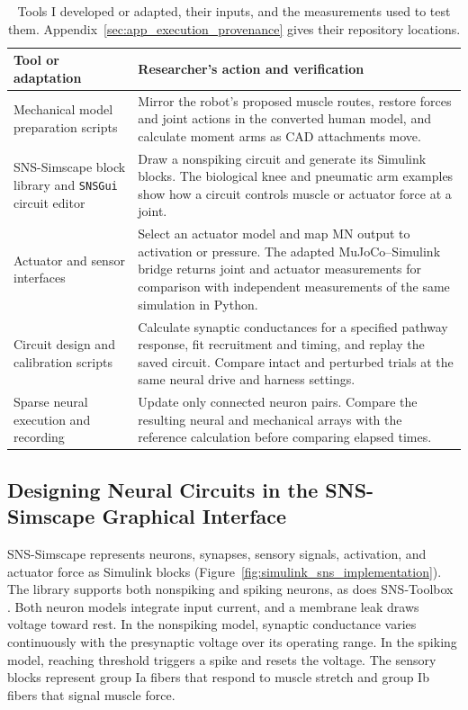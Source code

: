 \begin{table}[!htbp]
\centering\small
\caption[Tools developed or adapted for controller experiments]{Tools I developed or adapted, their inputs, and the measurements used to test them. Appendix~\ref{sec:app_execution_provenance} gives their repository locations.}
\label{tab:sns_capability}
\begin{tabularx}{\textwidth}{@{}>{\raggedright\arraybackslash}p{}>{\raggedright\arraybackslash}X@{}}
\toprule
Tool or adaptation & Researcher's action and verification \\
\midrule
Mechanical model preparation scripts & Mirror the robot's proposed muscle routes, restore forces and joint actions in the converted human model, and calculate moment arms as CAD attachments move. \\
SNS-Simscape block library and \texttt{SNSGui} circuit editor & Draw a nonspiking circuit and generate its Simulink blocks. The biological knee and pneumatic arm examples show how a circuit controls muscle or actuator force at a joint. \\
Actuator and sensor interfaces & Select an actuator model and map MN output to activation or pressure. The adapted MuJoCo--Simulink bridge returns joint and actuator measurements for comparison with independent measurements of the same simulation in Python. \\
Circuit design and calibration scripts & Calculate synaptic conductances for a specified pathway response, fit recruitment and timing, and replay the saved circuit. Compare intact and perturbed trials at the same neural drive and harness settings. \\
Sparse neural execution and recording & Update only connected neuron pairs. Compare the resulting neural and mechanical arrays with the reference calculation before comparing elapsed times. \\
\bottomrule
\end{tabularx}
\end{table}

\subsection{Designing Neural Circuits in the SNS-Simscape Graphical Interface}

SNS-Simscape represents neurons, synapses, sensory signals, activation, and actuator force as Simulink blocks (Figure~\ref{fig:simulink_sns_implementation}). The library supports both nonspiking and spiking neurons, as does SNS-Toolbox \citep{nourse_sns_2023}. Both neuron models integrate input current, and a membrane leak draws voltage toward rest. In the nonspiking model, synaptic conductance varies continuously with the presynaptic voltage over its operating range. In the spiking model, reaching threshold triggers a spike and resets the voltage. The sensory blocks represent group Ia fibers that respond to muscle stretch and group Ib fibers that signal muscle force.


